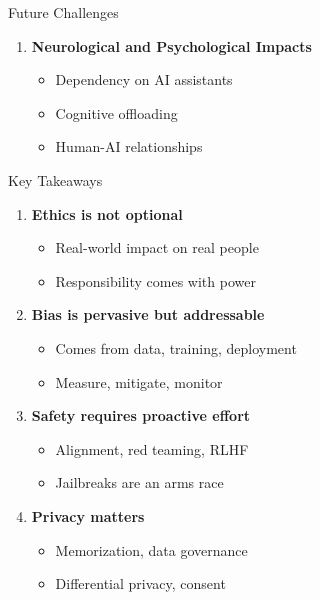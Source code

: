 \documentclass[aspectratio=169]{beamer}
\begin{document}
\begin{frame}[shrink=10]{Future Challenges 🔮}
\begin{enumerate}
    \item \textbf{Neurological and Psychological Impacts}
    \begin{itemize}\setlength{\itemsep}{0pt}
        \item Dependency on AI assistants
        \item Cognitive offloading
        \item Human-AI relationships
    \end{itemize}
\end{enumerate}
\end{frame}

\begin{frame}[shrink=10]{Key Takeaways 🔑}
\begin{enumerate}\setlength{\itemsep}{0pt}
    \item \textbf{Ethics is not optional}
    \begin{itemize}\setlength{\itemsep}{0pt}
        \item Real-world impact on real people
        \item Responsibility comes with power
    \end{itemize}

    \vspace{0.2em}

    \item \textbf{Bias is pervasive but addressable}
    \begin{itemize}\setlength{\itemsep}{0pt}
        \item Comes from data, training, deployment
        \item Measure, mitigate, monitor
    \end{itemize}

    \vspace{0.2em}

    \item \textbf{Safety requires proactive effort}
    \begin{itemize}\setlength{\itemsep}{0pt}
        \item Alignment, red teaming, RLHF
        \item Jailbreaks are an arms race
    \end{itemize}

    \vspace{0.2em}

    \item \textbf{Privacy matters}
    \begin{itemize}\setlength{\itemsep}{0pt}
        \item Memorization, data governance
        \item Differential privacy, consent
    \end{itemize}


\end{enumerate}
\end{frame}
\end{document}
